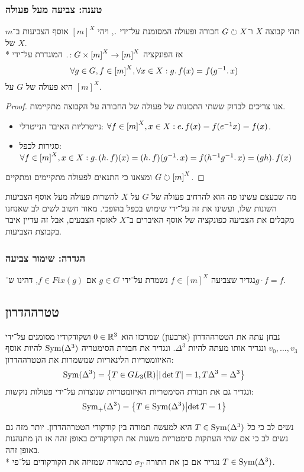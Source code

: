 \subsubsection{טענה: צביעה מעל פעולה}
תהי קבוצה $X$ ו־$G \circlearrowright X$ חבורה ופעולה המסומנת על־ידי $\ldotp$, ויהי ${[m]}^X$ אוסף הצביעות ב־$m$ של $X$. \\*
אז הפונקציה $\ldotp : G \times {[m]}^X \to {[m]}^X$ המוגדרת על־ידי
\[
	\forall g \in G, f \in {[m]}^X, \forall x \in X : g \ldotp f(x) = f(g^{-1} \ldotp x)
\]
היא פעולה של $G$ על ${[m]}^X$.
\begin{proof}
	אנו צריכים לבדוק ששתי התכונות של פעולה של החבורה על הקבוצה מתקיימות.
	\begin{itemize}
		\item נייטרליות האיבר הנייטרלי: $\forall f \in {[m]}^X, x \in X : e \ldotp f(x) = f(e^{-1} x) = f(x)$.
		\item סגירות לכפל: $\forall f \in {[m]}^X, x \in X : g \ldotp (h \ldotp f)(x) = (h \ldotp f)(g^{-1} \ldotp x) = f(h^{-1} g^{-1} \ldotp x) = (gh) \ldotp f(x)$
	\end{itemize}
	ומצאנו כי התנאים לפעולה מתקיימים ומתקיים $G \circlearrowright {[m]}^X$.
\end{proof}
מה שבעצם עשינו פה הוא להרחיב פעולה של $G$ על $X$ להשרות פעולה מעל אוסף הצביעות השונות שלו, ועשינו את זה על־ידי שימוש בכפל בהופכי.
מאוד חשוב לשים לב שאנחנו מקבלים את הצביעה כפונקציה של אוסף האיברים ב־$X$ לאוסף הצבעים, אבל זה עדיין איבר בקבוצת הצביעות.

\subsubsection{הגדרה: שימור צביעה}
נגדיר שצביעה $f \in {[m]}^X$ נשמרת על־ידי $g \in G$ אם $f \in Fix(g)$, דהינו ש־$g \cdot f = f$.

\subsection{טטרההדרון}
נבחן עתה את הטטרההדרון (ארבעון) שמרכזו הוא $0 \in \mathbb{R}^3$ ושקודקודיו מסומנים על־ידי $v_0, \dots, v_3$ ונגדיר אותו מעתה להיות $\Delta^3$.
ונגדיר את חבורת הסימטריה $\operatorname{Sym}(\Delta^3)$ להיות אוסף האיזומטריות הלינאריות שמשמרות את הטטרההדרון:
\[
	\operatorname{Sym}(\Delta^3) = \left\{ T \in GL_3(\mathbb{R}) \middle| |\det T| = 1, T\Delta^3 = \Delta^3\right\}
\]
ונגדיר גם את חבורת הסימטריות האיזומטריות שנוצרות על־ידי פעולות נוקשות:
\[
	\operatorname{Sym}_+(\Delta^3) = \left\{ T \in \operatorname{Sym}(\Delta^3) \middle| \det T = 1 \right\}
\]

נשים לב כי כל $T \in \operatorname{Sym}(\Delta^3)$ היא למעשה תמורה בין קודקודי הטטרההדרון. יותר מזה גם נשים לב כי אם שתי העתקות סימטריות משנות את הקודקודים באופן זהה אז הן מתנהגות באופן זהה. \\*
נגדיר אם כן את התורה $\sigma_T$ כתמורה שמזיזה את הקודקודים על־פי $T \in \operatorname{Sym}(\Delta^3)$.

